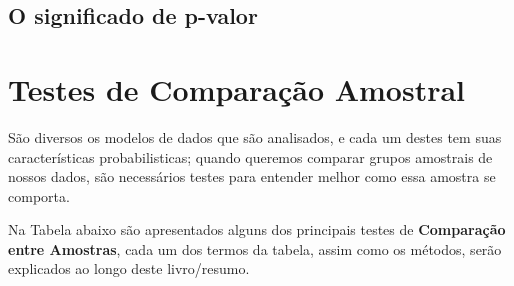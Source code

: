 \documentclass[
]{book}
\begin{document}
\hypertarget{o-significado-de-p-valor}{%
\subsection{O significado de p-valor}\label{o-significado-de-p-valor}}

\hypertarget{testes-de-comparauxe7uxe3o-amostral}{%
\section{Testes de Comparação Amostral}\label{testes-de-comparauxe7uxe3o-amostral}}

São diversos os modelos de dados que são analisados, e cada um destes tem suas características probabilisticas; quando queremos comparar grupos amostrais de nossos dados, são necessários testes para entender melhor como essa amostra se comporta.

Na Tabela abaixo são apresentados alguns dos principais testes de \textbf{Comparação entre Amostras}, cada um dos termos da tabela, assim como os métodos, serão explicados ao longo deste livro/resumo.
\end{document}
